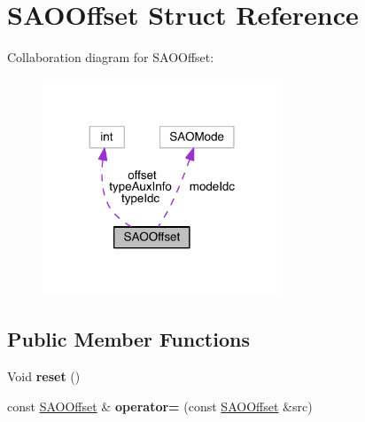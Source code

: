\hypertarget{struct_s_a_o_offset}{}\section{S\+A\+O\+Offset Struct Reference}
\label{struct_s_a_o_offset}


Collaboration diagram for S\+A\+O\+Offset\+:
\nopagebreak
\begin{figure}[H]
\begin{center}
\leavevmode
\includegraphics[width=203pt]{d2/dcc/struct_s_a_o_offset__coll__graph}
\end{center}
\end{figure}
\subsection*{Public Member Functions}
{\bf }\par
\begin{DoxyCompactItemize}
\item 
\mbox{\label{struct_s_a_o_offset_aa36f5cea0fc2fed2b90d2cd843655715}} 
Void {\bfseries reset} ()
\item 
\mbox{\label{struct_s_a_o_offset_add9cec3f5cf743ecd99e1ef7fd326e48}} 
const \hyperlink{struct_s_a_o_offset}{S\+A\+O\+Offset} \& {\bfseries operator=} (const \hyperlink{struct_s_a_o_offset}{S\+A\+O\+Offset} \&src)
\end{DoxyCompactItemize}

